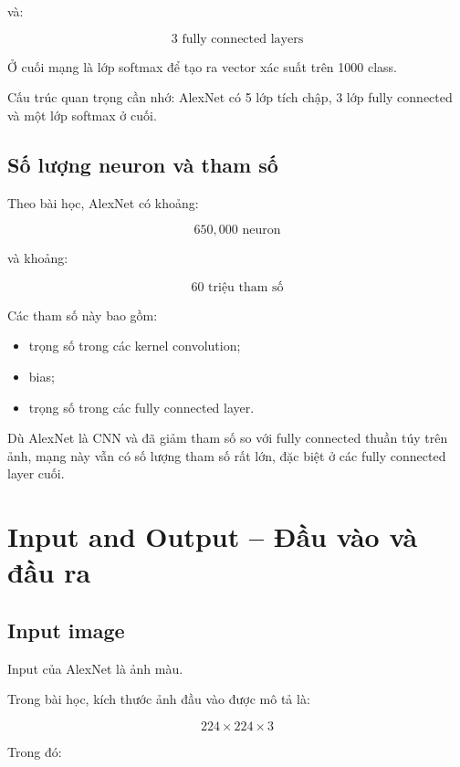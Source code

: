 và:

\[
    3 \text{ fully connected layers}
\]

Ở cuối mạng là lớp softmax để tạo ra vector xác suất trên 1000 class.

\begin{ghinho}
Cấu trúc quan trọng cần nhớ: AlexNet có 5 lớp tích chập, 3 lớp fully connected và một lớp softmax ở cuối.
\end{ghinho}

\subsection{Số lượng neuron và tham số}

Theo bài học, AlexNet có khoảng:

\[
    650{,}000 \text{ neuron}
\]

và khoảng:

\[
    60 \text{ triệu tham số}
\]

Các tham số này bao gồm:

\begin{itemize}
    \item trọng số trong các kernel convolution;
    \item bias;
    \item trọng số trong các fully connected layer.
\end{itemize}

\begin{canhbao}
Dù AlexNet là CNN và đã giảm tham số so với fully connected thuần túy trên ảnh, mạng này vẫn có số lượng tham số rất lớn, đặc biệt ở các fully connected layer cuối.
\end{canhbao}

\section{Input and Output -- Đầu vào và đầu ra}

\subsection{Input image}

Input của AlexNet là ảnh màu.

Trong bài học, kích thước ảnh đầu vào được mô tả là:

\[
    224 \times 224 \times 3
\]

Trong đó:

